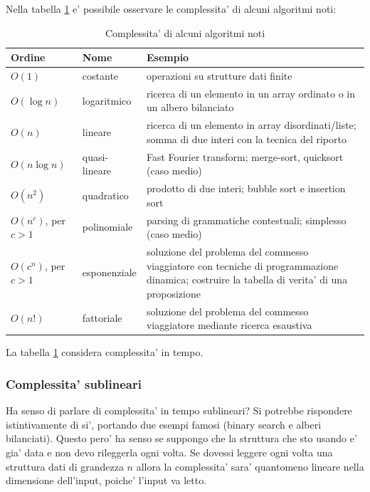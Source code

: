 Nella tabella \ref{algocomp} e' possibile osservare le complessita' di alcuni algoritmi noti:
\begin{table}[h]
    \begin{tabular}{|l|l|p{7cm}|}
        \hline
        \textbf{Ordine} & \textbf{Nome} & \textbf{Esempio} \\
        \hline
        $O(1)$ & costante & operazioni su strutture dati finite \\
        \hline
        $O(\log n)$ & logaritmico & ricerca di un elemento in un array ordinato o in un albero
        bilanciato \\
        \hline
        $O(n)$ & lineare & ricerca di un elemento in array disordinati/liste; somma di due interi con la
        tecnica del riporto\\
        \hline
        $O(n\log n)$ & quasi-lineare & Fast Fourier transform; merge-sort, quicksort (caso medio)\\
        \hline
        $O(n^{2})$ & quadratico & prodotto di due interi; bubble sort e insertion sort \\
        \hline
        $O(n^{c})$, per $c > 1$ & polinomiale & parsing di grammatiche contestuali; simplesso (caso
        medio)\\
        \hline
        $O(c^{n})$, per $c > 1$ & esponenziale & soluzione del problema del commesso viaggiatore con
        tecniche di programmazione dinamica; costruire la tabella di verita' di una proposizione \\
        \hline
        $O(n!)$ & fattoriale & soluzione del problema del commesso viaggiatore mediante ricerca esaustiva \\
        \hline
    \end{tabular}
    \caption{Complessita' di alcuni algoritmi noti}
    \label{algocomp}
\end{table}

La tabella \ref{algocomp} considera complessita' in tempo.

\subsubsection{Complessita' sublineari}

Ha senso di parlare di complessita' in tempo sublineari? Si potrebbe rispondere istintivamente di
si', portando due esempi famosi (binary search e alberi bilanciati). Questo pero' ha senso se
suppongo che la struttura che sto usando e' gia' data e non devo rileggerla ogni volta. Se dovessi
leggere ogni volta una struttura dati di grandezza $n$ allora la complessita' sara' quantomeno
lineare nella dimensione dell'input, poiche' l'input va letto.

